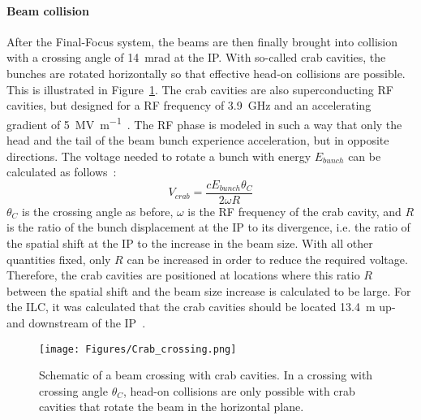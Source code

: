 \paragraph{Beam collision}
After the Final-Focus system, the beams are then finally brought into collision with a crossing angle of \SI{14}{\milli\radian} at the IP.\cite[p. 9-10]{TDR1}
With so-called crab cavities, the bunches are rotated horizontally so that effective head-on collisions are possible.
This is illustrated in Figure~\ref{fig:Crab_crossing}.
The crab cavities are also superconducting RF cavities, but designed for a RF frequency of \SI{3.9}{\giga\hertz} and an accelerating gradient of \SI{5}{\mega\volt\per\meter}~\cite[p. 154]{TDR32}.
The RF phase is modeled in such a way that only the head and the tail of the beam bunch experience acceleration, but in opposite directions.
The voltage needed to rotate a bunch with energy $E_{bunch}$ can be calculated as follows~\cite{Crab_cavities}:
\begin{equation}
 V_{crab}=\frac{cE_{bunch}\theta_C}{2\omega R}
\end{equation}
$\theta_C$ is the crossing angle as before, $\omega$ is the RF frequency of the crab cavity, and $R$ is the ratio of the bunch displacement at the IP to its divergence, i.e. the ratio of the spatial shift at the IP to the increase in the beam size.
With all other quantities fixed, only $R$ can be increased in order to reduce the required voltage.
Therefore, the crab cavities are positioned at locations where this ratio $R$ between the spatial shift and the beam size increase is calculated to be large.
For the ILC, it was calculated that the crab cavities should be located \SI{13.4}{\meter} up- and downstream of the IP~\cite[p. 154]{TDR32}.
\begin{figure}
\centering
\texttt{[image: Figures/Crab\_crossing.png]}
\caption[Schematic of a beam crossing with crab cavities]{Schematic of a beam crossing with crab cavities. In a crossing with crossing angle $\theta_C$, head-on collisions are only possible with crab cavities that rotate the beam in the horizontal plane.}
\label{fig:Crab_crossing}
\end{figure}

